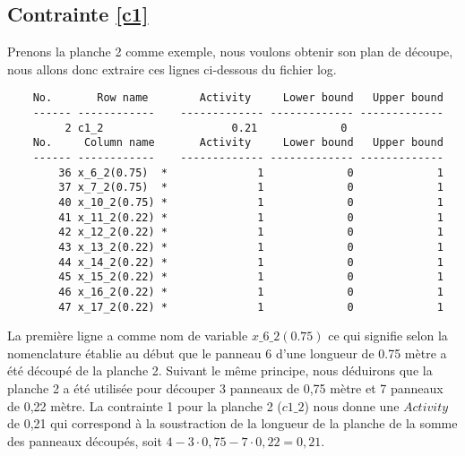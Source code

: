 \documentclass{article}[A4]
\begin{document}
\subsection{Contrainte \ref{c1}}
Prenons la planche 2 comme exemple, nous voulons obtenir son plan de 
découpe, nous allons donc extraire ces lignes ci-dessous du fichier log.
\begin{verbatim}
	No.       Row name        Activity     Lower bound   Upper bound
	------ ------------    ------------- ------------- -------------
	     2 c1_2                    0.21             0               
	No.     Column name       Activity     Lower bound   Upper bound
	------ ------------    ------------- ------------- -------------
	    36 x_6_2(0.75)  *              1             0             1 
	    37 x_7_2(0.75)  *              1             0             1 
	    40 x_10_2(0.75) *              1             0             1 
	    41 x_11_2(0.22) *              1             0             1 
	    42 x_12_2(0.22) *              1             0             1 
	    43 x_13_2(0.22) *              1             0             1 
	    44 x_14_2(0.22) *              1             0             1 
	    45 x_15_2(0.22) *              1             0             1 
	    46 x_16_2(0.22) *              1             0             1 
	    47 x_17_2(0.22) *              1             0             1 

\end{verbatim}
La première ligne a comme nom de variable \texttt{$x\_6\_2(0.75)$} ce 
qui signifie selon la nomenclature établie au début que le panneau 6 
d'une longueur de 0.75 mètre a été découpé de la planche 2. Suivant le 
même principe, nous déduirons que la planche 2 a été utilisée pour 
découper 3 panneaux de 0,75 mètre et 7 panneaux de 0,22 mètre. La 
contrainte 1 pour la planche 2 (\texttt{$c1\_2$}) nous donne une 
$Activity$ de 0,21 qui correspond à la soustraction de la longueur de 
la planche de la somme des panneaux découpés, soit $4 - 3 \cdot 0,75 - 
7 \cdot 0,22 = 0,21$.
\end{document}
